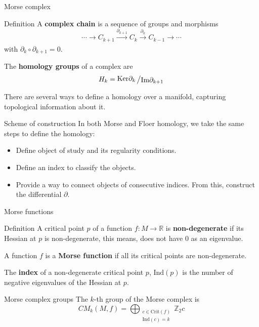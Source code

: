 \documentclass{beamer}
\newcommand{\con}[1]{\mathbb{#1}}
\newcommand{\R}{\con{R}}
\newcommand{\quocient}[2]{{\raisebox{.1em}{$#1$}\left/\raisebox{-.1em}{$#2$}\right.}}
\begin{document}
\begin{frame}{Morse complex}
	\begin{block}{Definition}
		A {\bf complex chain} is a sequence of groups and morphisms
		\[\cdots \rightarrow C_{k+1} \xrightarrow[]{\partial_{k+1}} C_k \xrightarrow[]{\partial_k} C_{k-1} \rightarrow \cdots\]
		with $\partial_k \circ \partial_{k+1} = 0$.

		The {\bf homology groups} of a complex are
		\[H_k = \quocient{\mathrm{Ker} \partial_k}{\mathrm{Im} \partial_{k+1}}\]
	\end{block}

	There are several ways to define a homology over a manifold, capturing topological information about it.
\end{frame}

\begin{frame}{Scheme of construction}
	In both Morse and Floer homology, we take the same steps to define the homology:
	\begin{itemize}
		\item Define object of study and its regularity conditions.
		\item Define an index to classify the objects.
		\item Provide a way to connect objects of consecutive indices. From this, construct the differential $\partial$.
	\end{itemize}
\end{frame}

\begin{frame}{Morse functions}
	\begin{block}{Definition}
		A critical point $p$ of a function $f : M \rightarrow \R$ is {\bf non-degenerate} if its Hessian at $p$ is non-degenerate, this means, does not have $0$ as an eigenvalue.

		A function $f$ is a {\bf Morse function} if all its critical points are non-degenerate.

		The {\bf index} of a non-degenerate critical point $p$, $\mathrm{Ind}(p)$ is the number of negative eigenvalues of the Hessian at $p$.
	\end{block}

	\begin{block}{Morse complex groups}
		The $k$-th group of the Morse complex is
		\[CM_k(M,f) = \bigoplus_{\substack{c \in \mathrm{Crit}(f) \\ \mathrm{Ind}(c) = k}} \con{Z}_2 c\]
	\end{block}
\end{frame}
\end{document}
